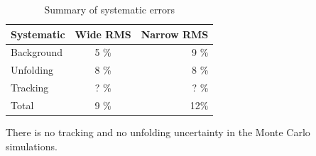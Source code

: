 \begin{table}[htb]
\centering
\caption{Summary of systematic errors}
\label{tab:systematics}
\begin{tabular}{ l | c | r }
  Systematic & Wide RMS & Narrow RMS \\
    \hline			
  Background & 5 \% & 9 \% \\
  Unfolding & 8 \% & 8 \% \\
  Tracking & ? \% & ? \% \\
  Total & 9 \% & 12\% \\
  \hline
  \end{tabular}
  \end{table}

There is no tracking and no unfolding uncertainty in the Monte Carlo simulations. 